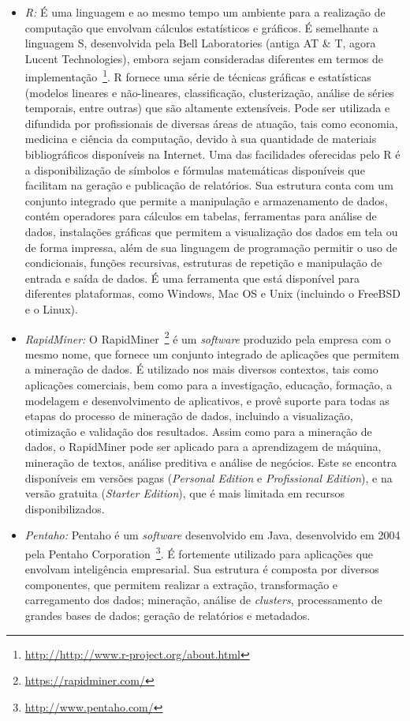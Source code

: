 \begin{itemize}

\item \textit{R:} É uma linguagem e ao mesmo tempo um ambiente para a realização de computação que envolvam cálculos estatísticos e gráficos. É semelhante a linguagem S, desenvolvida pela Bell Laboratories (antiga AT \& T, agora Lucent Technologies), embora sejam consideradas diferentes em termos de implementação~\footnote{\url{http://http://www.r-project.org/about.html}}. R fornece uma série de técnicas gráficas e estatísticas (modelos lineares e não-lineares, classificação, clusterização, análise de séries temporais, entre outras) que são altamente extensíveis. Pode ser utilizada e difundida por profissionais de diversas áreas de atuação, tais como economia, medicina e ciência da computação, devido à sua quantidade de materiais bibliográficos disponíveis na Internet. Uma das facilidades oferecidas pelo R é a disponibilização de símbolos e fórmulas matemáticas disponíveis que facilitam na geração e publicação de relatórios. Sua estrutura conta com um conjunto integrado que permite a manipulação e armazenamento de dados, contém operadores para cálculos em tabelas, ferramentas para análise de dados, instalações gráficas que permitem a visualização dos dados em tela ou de forma impressa, além de sua linguagem de programação permitir o uso de condicionais, funções recursivas, estruturas de repetição e manipulação de entrada e saída de dados. É uma ferramenta que está disponível para diferentes plataformas, como Windows, Mac OS e Unix (incluindo o FreeBSD e o Linux).

\item \textit{RapidMiner:} O RapidMiner~\footnote{ \url{https://rapidminer.com/}} é um \textit{software} produzido pela empresa com o mesmo nome, que fornece um conjunto integrado de aplicações que permitem a mineração de dados. É utilizado nos mais diversos contextos, tais como aplicações comerciais, bem como para a investigação, educação, formação, a modelagem e desenvolvimento de aplicativos, e provê suporte para todas as etapas do processo de mineração de dados, incluindo a visualização, otimização e validação dos resultados. Assim como para a mineração de dados, o RapidMiner pode ser aplicado para a aprendizagem de máquina, mineração de textos, análise preditiva e análise de negócios. Este se encontra disponíveis em versões pagas (\textit{Personal Edition} e \textit{Profissional Edition}), e na versão gratuita (\textit{Starter Edition}), que é mais limitada em recursos disponibilizados.

\item \textit{Pentaho:} Pentaho é um \textit{software} desenvolvido em Java, desenvolvido em 2004 pela Pentaho Corporation~\footnote{\url{http://www.pentaho.com/}}. É fortemente utilizado para aplicações que envolvam inteligência empresarial. Sua estrutura é composta por diversos componentes, que permitem realizar a extração, transformação e carregamento dos dados; mineração, análise de \textit{clusters}, processamento de grandes bases de dados; geração de relatórios e metadados.
\end{itemize}

